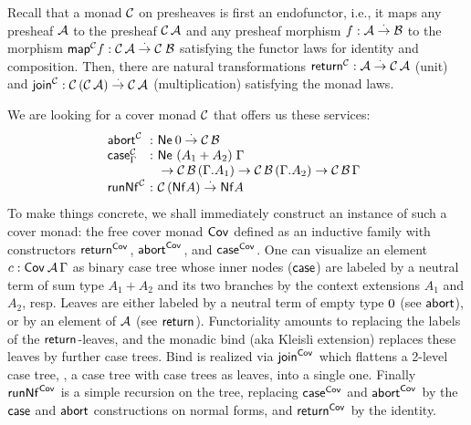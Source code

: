 \documentclass[sigplan,screen,fleqn]{acmart}
\begin{document}
Recall that a monad $\C$ on presheaves is first an endofunctor,
i.e., it maps any presheaf $\A$ to the presheaf $\C\,\A$ and any
presheaf morphism $f : \A \todot \B$ to the morphism
$\tmap[\C]f: \C\,\A \todot \C\;\B$ satisfying the functor laws for
identity and composition.  Then, there are natural transformations
$\treturn[\C] : \A \todot \C\,\A$ (unit) and
$\tjoin[\C] : \C\,(\C\,\A) \todot \C\,\A$ (multiplication)
satisfying
the monad laws.

We are looking for a cover monad $\C$ that
offers us these services:
\[
\begin{array}{l@{~}c@{~}l@{\quad}l}
\tabort^\C & : & \tNe\, \tyzero \todot \C\,\B
\\
\tcase^\C_\Gamma & : & \Ne {(A_1 + A_2)} \Gamma
\\
  && {} \to \C\,\B\,(\cext \Gamma {A_1})
  \to \C\,\B\,(\cext \Gamma {A_2})
  \to \C\,\B\,\Gamma
\\
\trunNf[\C] & : & \C\,(\tNf A) \todot \tNf A
\\
\end{array}
\]
To make things concrete,
we shall immediately construct an instance of such a cover monad:
the free cover monad
$\Cov$ defined
as an inductive family with constructors
$\treturn[\Cov]$, $\tabort^{\Cov}$, and
$\tcase^{\Cov}$.  One can visualize an element $c : \Cov\,\A\,\Gamma$ as
binary case tree whose inner nodes ($\tcase$) are labeled by a neutral term
of sum type $A_1+A_2$ and its two branches by the context extensions $A_1$
and $A_2$, resp.  Leaves are either
labeled by a neutral term of empty type $\tyzero$ (see $\tabort$),
or by an element of $\A$ (see $\treturn$).  Functoriality amounts to
replacing the labels of the $\treturn$-leaves, and the monadic bind
(aka Kleisli extension) replaces
these leaves by further case trees.  Bind is realized via $\tjoin[\Cov]$
which flattens a 2-level case tree, \ie, a case tree with case trees as
leaves, into a single one.
Finally $\trunNf[\Cov]$ is a simple recursion on the tree, replacing $\tcase^{\Cov}$
and $\tabort^{\Cov}$
by the $\tcase$ and $\tabort$ constructions on normal forms, and
$\treturn[\Cov]$ by the identity.
\end{document}
